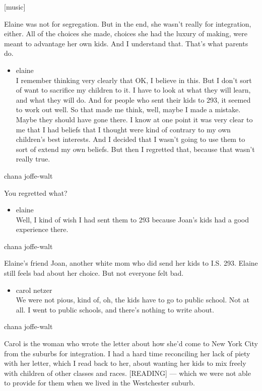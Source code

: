 {[}music{]}

Elaine was not for segregation. But in the end, she wasn't really for
integration, either. All of the choices she made, choices she had the
luxury of making, were meant to advantage her own kids. And I understand
that. That's what parents do.

\begin{itemize}
\tightlist
\item
  elaine\\
  I remember thinking very clearly that OK, I believe in this. But I
  don't sort of want to sacrifice my children to it. I have to look at
  what they will learn, and what they will do. And for people who sent
  their kids to 293, it seemed to work out well. So that made me think,
  well, maybe I made a mistake. Maybe they should have gone there. I
  know at one point it was very clear to me that I had beliefs that I
  thought were kind of contrary to my own children's best interests. And
  I decided that I wasn't going to use them to sort of extend my own
  beliefs. But then I regretted that, because that wasn't really true.
\end{itemize}

chana joffe-walt

You regretted what?

\begin{itemize}
\tightlist
\item
  elaine\\
  Well, I kind of wish I had sent them to 293 because Joan's kids had a
  good experience there.
\end{itemize}

chana joffe-walt

Elaine's friend Joan, another white mom who did send her kids to I.S.
293. Elaine still feels bad about her choice. But not everyone felt bad.

\begin{itemize}
\tightlist
\item
  carol netzer\\
  We were not pious, kind of, oh, the kids have to go to public school.
  Not at all. I went to public schools, and there's nothing to write
  about.
\end{itemize}

chana joffe-walt

Carol is the woman who wrote the letter about how she'd come to New York
City from the suburbs for integration. I had a hard time reconciling her
lack of piety with her letter, which I read back to her, about wanting
her kids to mix freely with children of other classes and races.
{[}READING{]} --- which we were not able to provide for them when we
lived in the Westchester suburb.

